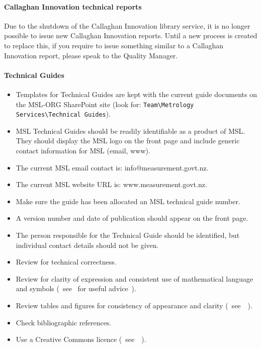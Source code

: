 \paragraph{Callaghan Innovation technical reports}
Due to the shutdown of the Callaghan Innovation library service, it is no longer possible to issue new Callaghan Innovation reports.  Until a new process is created to replace this, if you require to issue something similar to a Callaghan Innovation report, please speak to the Quality Manager.

\paragraph{Technical Guides}

\begin{itemize}
\item  Templates for Technical Guides are kept with the current guide documents on the MSL-ORG SharePoint site (look for: 
\verb|Team\Metrology Services\Technical Guides|).
\item MSL Technical Guides should be readily identifiable as a product of MSL. They should display the MSL logo on the front page and include generic contact information for MSL (email, www). 
\item  The current MSL email contact is: info@measurement.govt.nz.
\item  The current MSL website URL is: www.measurement.govt.nz.
\item  Make sure the guide has been allocated an MSL technical guide number.
\item  A version number and date of publication should appear on the front page.
\item  The person responsible for the Technical Guide should be identified, but individual contact details should not be given.
\item  Review for technical correctness.
\item  Review for clarity of expression and consistent use of mathematical language and symbols (~see~\cite[\S\ref*{GRP-s:scientific_documents}]{MSL_Reporting_Guidelines} for useful advice~).
\item  Review tables and figures for consistency of appearance and clarity (~see~\cite[\S\ref*{GRP-s:scientific_documents}]{MSL_Reporting_Guidelines}~).
\item  Check bibliographic references. 
\item  Use a Creative Commons licence (~see~\cite[\S\ref*{GRP-s_copyright}]{MSL_Reporting_Guidelines}~).
\end{itemize}

